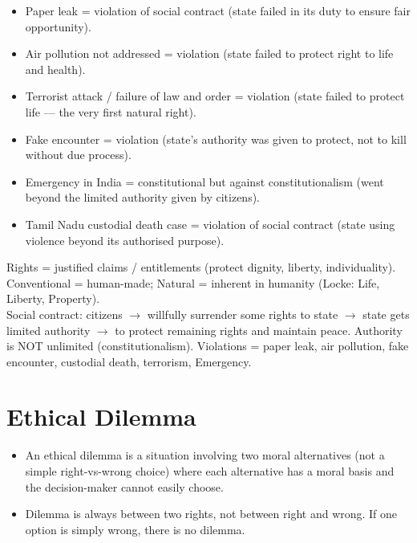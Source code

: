 \begin{ExampleBox}
\begin{itemize}
\item Paper leak = violation of social contract (state failed in its duty to ensure fair opportunity).
\item Air pollution not addressed = violation (state failed to protect right to life and health).
\item Terrorist attack / failure of law and order = violation (state failed to protect life --- the very first natural right).
\item Fake encounter = violation (state's authority was given to protect, not to kill without due process).
\item Emergency in India = constitutional but against constitutionalism (went beyond the limited authority given by citizens).
\item Tamil Nadu custodial death case = violation of social contract (state using violence beyond its authorised purpose).
\end{itemize}
\end{ExampleBox}

\begin{QuickRevision}
Rights = justified claims / entitlements (protect dignity, liberty, individuality). Conventional = human-made; Natural = inherent in humanity (Locke: Life, Liberty, Property).\\
Social contract: citizens $\rightarrow$ willfully surrender some rights to state $\rightarrow$ state gets limited authority $\rightarrow$ to protect remaining rights and maintain peace. Authority is NOT unlimited (constitutionalism). Violations = paper leak, air pollution, fake encounter, custodial death, terrorism, Emergency.
\end{QuickRevision}

\section{Ethical Dilemma}

\begin{KeyConcept}
\begin{itemize}
\item An ethical dilemma is a situation involving two moral alternatives (not a simple right-vs-wrong choice) where each alternative has a moral basis and the decision-maker cannot easily choose.
\item Dilemma is always between two rights, not between right and wrong. If one option is simply wrong, there is no dilemma.
\end{itemize}
\end{KeyConcept}

